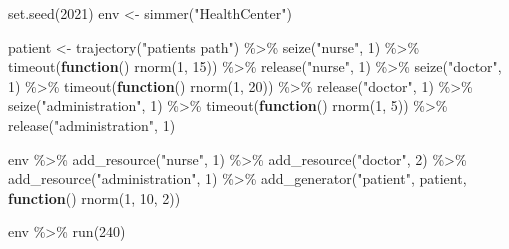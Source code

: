 \documentclass[
]{book}
\newenvironment{Shaded}{\begin{snugshade}}{\end{snugshade}}
\newcommand{\ControlFlowTok}[1]{\textcolor[rgb]{0.13,0.29,0.53}{\textbf{#1}}}
\newcommand{\DecValTok}[1]{\textcolor[rgb]{0.00,0.00,0.81}{#1}}
\newcommand{\FunctionTok}[1]{\textcolor[rgb]{0.00,0.00,0.00}{#1}}
\newcommand{\NormalTok}[1]{#1}
\newcommand{\OtherTok}[1]{\textcolor[rgb]{0.56,0.35,0.01}{#1}}
\newcommand{\SpecialCharTok}[1]{\textcolor[rgb]{0.00,0.00,0.00}{#1}}
\newcommand{\StringTok}[1]{\textcolor[rgb]{0.31,0.60,0.02}{#1}}
\theoremstyle{definition}
\theoremstyle{definition}
\theoremstyle{definition}
\theoremstyle{definition}
\theoremstyle{remark}
\begin{document}
\begin{Shaded}
\begin{Highlighting}[]
\FunctionTok{set.seed}\NormalTok{(}\DecValTok{2021}\NormalTok{)}
\NormalTok{env }\OtherTok{\textless{}{-}} \FunctionTok{simmer}\NormalTok{(}\StringTok{"HealthCenter"}\NormalTok{)}

\NormalTok{patient }\OtherTok{\textless{}{-}} \FunctionTok{trajectory}\NormalTok{(}\StringTok{"patients\textquotesingle{} path"}\NormalTok{) }\SpecialCharTok{\%\textgreater{}\%}
  \FunctionTok{seize}\NormalTok{(}\StringTok{"nurse"}\NormalTok{, }\DecValTok{1}\NormalTok{) }\SpecialCharTok{\%\textgreater{}\%}
  \FunctionTok{timeout}\NormalTok{(}\ControlFlowTok{function}\NormalTok{() }\FunctionTok{rnorm}\NormalTok{(}\DecValTok{1}\NormalTok{, }\DecValTok{15}\NormalTok{)) }\SpecialCharTok{\%\textgreater{}\%}
  \FunctionTok{release}\NormalTok{(}\StringTok{"nurse"}\NormalTok{, }\DecValTok{1}\NormalTok{) }\SpecialCharTok{\%\textgreater{}\%}
  \FunctionTok{seize}\NormalTok{(}\StringTok{"doctor"}\NormalTok{, }\DecValTok{1}\NormalTok{) }\SpecialCharTok{\%\textgreater{}\%}
  \FunctionTok{timeout}\NormalTok{(}\ControlFlowTok{function}\NormalTok{() }\FunctionTok{rnorm}\NormalTok{(}\DecValTok{1}\NormalTok{, }\DecValTok{20}\NormalTok{)) }\SpecialCharTok{\%\textgreater{}\%}
  \FunctionTok{release}\NormalTok{(}\StringTok{"doctor"}\NormalTok{, }\DecValTok{1}\NormalTok{) }\SpecialCharTok{\%\textgreater{}\%}
  \FunctionTok{seize}\NormalTok{(}\StringTok{"administration"}\NormalTok{, }\DecValTok{1}\NormalTok{) }\SpecialCharTok{\%\textgreater{}\%}
  \FunctionTok{timeout}\NormalTok{(}\ControlFlowTok{function}\NormalTok{() }\FunctionTok{rnorm}\NormalTok{(}\DecValTok{1}\NormalTok{, }\DecValTok{5}\NormalTok{)) }\SpecialCharTok{\%\textgreater{}\%}
  \FunctionTok{release}\NormalTok{(}\StringTok{"administration"}\NormalTok{, }\DecValTok{1}\NormalTok{)}

\NormalTok{env }\SpecialCharTok{\%\textgreater{}\%}
  \FunctionTok{add\_resource}\NormalTok{(}\StringTok{"nurse"}\NormalTok{, }\DecValTok{1}\NormalTok{) }\SpecialCharTok{\%\textgreater{}\%}
  \FunctionTok{add\_resource}\NormalTok{(}\StringTok{"doctor"}\NormalTok{, }\DecValTok{2}\NormalTok{) }\SpecialCharTok{\%\textgreater{}\%}
  \FunctionTok{add\_resource}\NormalTok{(}\StringTok{"administration"}\NormalTok{, }\DecValTok{1}\NormalTok{) }\SpecialCharTok{\%\textgreater{}\%}
  \FunctionTok{add\_generator}\NormalTok{(}\StringTok{"patient"}\NormalTok{, patient, }\ControlFlowTok{function}\NormalTok{() }\FunctionTok{rnorm}\NormalTok{(}\DecValTok{1}\NormalTok{, }\DecValTok{10}\NormalTok{, }\DecValTok{2}\NormalTok{))}

\NormalTok{env }\SpecialCharTok{\%\textgreater{}\%} \FunctionTok{run}\NormalTok{(}\DecValTok{240}\NormalTok{)}
\end{Highlighting}
\end{Shaded}
\end{document}
